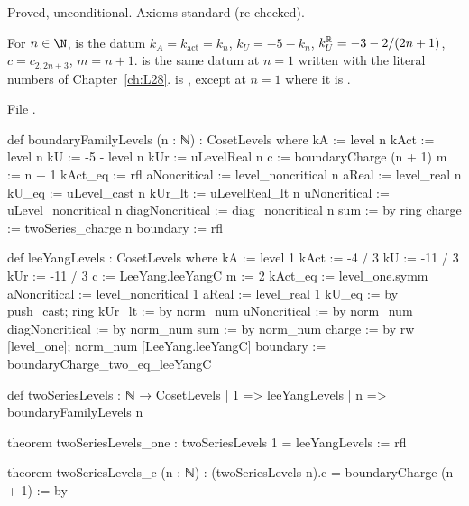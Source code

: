 \begin{status}
Proved, unconditional. Axioms standard (re-checked).
\end{status}

\begin{definition}\label{l29:def:twolevels}
For $n\in\N$,  is the datum $k_A=k_{\mathrm{act}}=k_n$, $k_U=-5-k_n$,
$k_U^{\mathbb{R}}=-3-2/(2n+1)$, $c=c_{2,2n+3}$, $m=n+1$.  is the same datum at $n=1$ written with the
literal numbers of Chapter~\ref{ch:L28}.  is , except at $n=1$
where it is .
\end{definition}

\noindent File .
\begin{leancode}
def boundaryFamilyLevels (n : ℕ) : CosetLevels where
  kA := level n
  kAct := level n
  kU := -5 - level n
  kUr := uLevelReal n
  c := boundaryCharge (n + 1)
  m := n + 1
  kAct_eq := rfl
  aNoncritical := level_noncritical n
  aReal := level_real n
  kU_eq := uLevel_cast n
  kUr_lt := uLevelReal_lt n
  uNoncritical := uLevel_noncritical n
  diagNoncritical := diag_noncritical n
  sum := by ring
  charge := twoSeries_charge n
  boundary := rfl

def leeYangLevels : CosetLevels where
  kA := level 1
  kAct := -4 / 3
  kU := -11 / 3
  kUr := -11 / 3
  c := LeeYang.leeYangC
  m := 2
  kAct_eq := level_one.symm
  aNoncritical := level_noncritical 1
  aReal := level_real 1
  kU_eq := by push_cast; ring
  kUr_lt := by norm_num
  uNoncritical := by norm_num
  diagNoncritical := by norm_num
  sum := by norm_num
  charge := by rw [level_one]; norm_num [LeeYang.leeYangC]
  boundary := boundaryCharge_two_eq_leeYangC

def twoSeriesLevels : ℕ → CosetLevels
  | 1 => leeYangLevels
  | n => boundaryFamilyLevels n

theorem twoSeriesLevels_one : twoSeriesLevels 1 = leeYangLevels := rfl

theorem twoSeriesLevels_c (n : ℕ) : (twoSeriesLevels n).c = boundaryCharge (n + 1) := by
\end{leancode}

